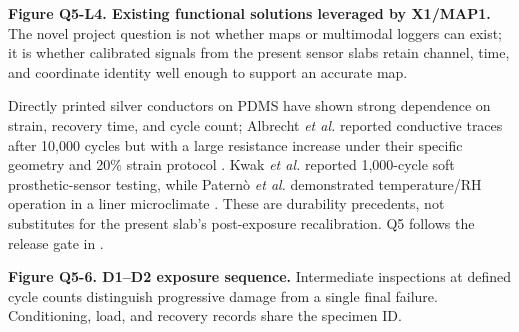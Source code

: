 \vfill
{\fontsize{6.7}{7.7}\selectfont\color{AUBGray}
\textbf{Figure Q5-L4. Existing functional solutions leveraged by X1/MAP1.}
The novel project question is not whether maps or multimodal loggers can exist;
it is whether calibrated signals from the present sensor slabs retain channel,
time, and coordinate identity well enough to support an accurate map.\par}

\clearpage
\hypertarget{q5-durability}{}


{\fontsize{8.9}{10.45}\selectfont
Directly printed silver conductors on PDMS have shown strong dependence on
strain, recovery time, and cycle count; Albrecht \textit{et al.} reported
conductive traces after 10,000 cycles but with a large resistance increase
under their specific geometry and 20\% strain protocol
\cite{albrecht2018stretch}. Kwak \textit{et al.} reported 1,000-cycle soft
prosthetic-sensor testing, while Patern\`o \textit{et al.} demonstrated
temperature/RH operation in a liner microclimate \cite{q3kwak2020,paterno2020}.
These are durability precedents, not substitutes for the present slab's
post-exposure recalibration. Q5 follows the release gate in
.\par}

\begin{center}
\end{center}
{\fontsize{7.5}{8.7}\selectfont\color{AUBGray}
\textbf{Figure Q5-6. D1--D2 exposure sequence.} Intermediate inspections at
defined cycle counts distinguish progressive damage from a single final
failure. Conditioning, load, and recovery records share the specimen ID.\par}

